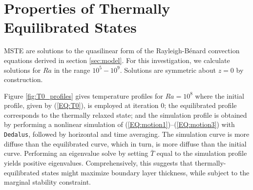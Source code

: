 \documentclass[reprint,amsmath,amssymb,aps]{revtex4-1}
\begin{document}
\section{Properties of Thermally Equilibrated States}\label{sec:properties}
MSTE are solutions to the quasilinear form of the Rayleigh-B\'enard convection equations derived in section \ref{sec:model}. 
For this investigation, we calculate solutions for $Ra$ in the range $10^5 - 10^9$. 
Solutions are symmetric about $z = 0$ by construction. 

Figure \ref{fig:T0_profiles} gives temperature profiles for $Ra = 10^8$ where the initial profile, given by (\ref{EQ:T0}), is employed at iteration 0; the equilibrated profile corresponds to the thermally relaxed state; and the simulation profile is obtained by performing a nonlinear simulation of (\ref{EQ:motion1})--(\ref{EQ:motion3}) with \texttt{Dedalus}, followed by horizontal and time averaging. 
The simulation curve is more diffuse than the equilibrated curve, which in turn, is more diffuse than the initial curve. 
Performing an eigenvalue solve by setting $\bar{T}$ equal to the simulation profile yields positive eigenvalues. 
Comprehensively, this suggests that thermally-equilibrated states might maximize boundary layer thickness, while subject to the marginal stability constraint.
\end{document}

